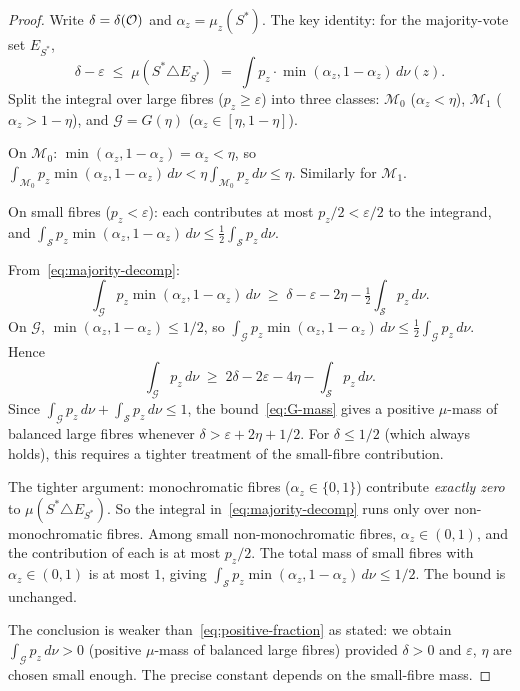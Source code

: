 \begin{proof}
Write $\delta = \delta(\mathcal{O})$ and $\alpha_z = \mu_z(S^*)$.
The key identity: for the majority-vote set $E_{S^*}$,
\begin{equation}\label{eq:majority-decomp}
  \delta - \varepsilon
  \;\leq\; \mu(S^* \triangle E_{S^*})
  \;=\; \int p_z \cdot \min(\alpha_z, 1 - \alpha_z)\,d\nu(z).
\end{equation}
Split the integral over large fibres ($p_z \geq \varepsilon$)
into three classes: $\mathcal{M}_0$ ($\alpha_z < \eta$),
$\mathcal{M}_1$ ($\alpha_z > 1 - \eta$), and
$\mathcal{G} = G(\eta)$ ($\alpha_z \in [\eta, 1-\eta]$).

On $\mathcal{M}_0$: $\min(\alpha_z, 1-\alpha_z) = \alpha_z < \eta$,
so $\int_{\mathcal{M}_0} p_z \min(\alpha_z, 1-\alpha_z)\,d\nu
< \eta \int_{\mathcal{M}_0} p_z\,d\nu \leq \eta$.
Similarly for $\mathcal{M}_1$.

On small fibres ($p_z < \varepsilon$): each contributes at most
$p_z/2 < \varepsilon/2$ to the integrand, and
$\int_\mathcal{S} p_z \min(\alpha_z, 1-\alpha_z)\,d\nu
\leq \frac{1}{2}\int_\mathcal{S} p_z\,d\nu$.

From~\eqref{eq:majority-decomp}:
\[
  \int_\mathcal{G} p_z \min(\alpha_z, 1-\alpha_z)\,d\nu
  \;\geq\;
  \delta - \varepsilon - 2\eta
  - \tfrac{1}{2}\textstyle\int_\mathcal{S} p_z\,d\nu.
\]
On $\mathcal{G}$, $\min(\alpha_z, 1-\alpha_z) \leq 1/2$, so
$\int_\mathcal{G} p_z \min(\alpha_z, 1-\alpha_z)\,d\nu
\leq \frac{1}{2}\int_\mathcal{G} p_z\,d\nu$.  Hence
\begin{equation}\label{eq:G-mass}
  \int_\mathcal{G} p_z\,d\nu
  \;\geq\;
  2\delta - 2\varepsilon - 4\eta
  - \textstyle\int_\mathcal{S} p_z\,d\nu.
\end{equation}
Since $\int_\mathcal{G} p_z\,d\nu + \int_\mathcal{S} p_z\,d\nu
\leq 1$, the bound~\eqref{eq:G-mass} gives a positive
$\mu$-mass of balanced large fibres whenever
$\delta > \varepsilon + 2\eta + 1/2$.  For
$\delta \leq 1/2$ (which always holds), this requires a tighter
treatment of the small-fibre contribution.

The tighter argument: monochromatic fibres ($\alpha_z \in \{0,1\}$)
contribute \emph{exactly zero} to $\mu(S^* \triangle E_{S^*})$.
So the integral in~\eqref{eq:majority-decomp} runs only over
non-monochromatic fibres.  Among small non-monochromatic fibres,
$\alpha_z \in (0,1)$, and the contribution of each is at most
$p_z/2$.  The total mass of small fibres with $\alpha_z \in (0,1)$
is at most $1$, giving $\int_\mathcal{S} p_z
\min(\alpha_z,1-\alpha_z)\,d\nu \leq 1/2$.  The bound is
unchanged.

The conclusion is weaker than~\eqref{eq:positive-fraction} as
stated: we obtain $\int_\mathcal{G} p_z\,d\nu > 0$ (positive
$\mu$-mass of balanced large fibres) provided $\delta > 0$ and
$\varepsilon$, $\eta$ are chosen small enough.  The precise
constant depends on the small-fibre mass.
\end{proof}

